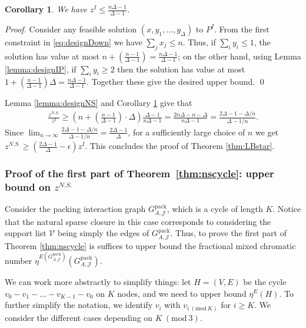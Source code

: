 \documentclass[smallextended]{svjour3}
\newtheorem{corollary}[proposition]{Corollary}
\begin{document}
	\begin{corollary}\label{cor:designOpt}
		We have $z^I \le \frac{n \Delta - 1}{\Delta -1}$.
	\end{corollary}
	
	\begin{proof}
		Consider any feasible solution $(x, y_1, \ldots, y_\Delta)$ to $P^I$. From the first constraint in \eqref{eq:designDown} we have $\sum_j x_j \le n$. Thus, if $\sum_i y_i \le 1$, the solution has value at most $n + \left(\frac{n-1}{\Delta -1}\right) = \frac{n \Delta - 1}{\Delta - 1}$; on the other hand, using Lemma \ref{lemma:designIP}, if $\sum_i y_i \ge 2$ then the solution has value at most $1 + \left(\frac{n-1}{\Delta -1}\right) \Delta = \frac{n \Delta - 1}{\Delta -1}$. Together these give the desired upper bound.{
\ifmp
	\hfill \qed
\fi
}
	\end{proof}
	
	Lemma \ref{lemma:designNS} and Corollary \ref{cor:designOpt} give that
		\begin{align*}
		\frac{z^{N.S.}}{z^I} \geq
\left( n + \left(\frac{n-1}{\Delta -1}\right) \cdot \Delta\right) \frac{\Delta-1}{n \Delta - 1} = \frac{2n \Delta - n - \Delta}{n \Delta-1} = \frac{2 \Delta - 1 - \Delta/n}{\Delta - 1/n}.
	\end{align*}
	Since $\lim_{n \rightarrow \infty} \frac{2 \Delta - 1 - \Delta/n}{\Delta - 1/n} = \frac{2\Delta -1}{\Delta}$, for a sufficiently large choice of $n$ we get $z^{N.S.} \ge \left(\frac{2 \Delta - 1}{\Delta} - \epsilon\right) z^I$. This concludes the proof of Theorem \ref{thm:LBstar}.

{}

\subsubsection{Proof of the first part of Theorem~\ref{thm:nscycle}: upper bound on $z^{N.S.}$}

	Consider the packing interaction graph ${G^{\textrm{pack}}_{A, {\mathcal{J}}}}$, which is a cycle of length $K$. Notice that the natural sparse closure in this case corresponds to considering the support list ${\mathcal{V}}$ being simply the edges of ${G^{\textrm{pack}}_{A, {\mathcal{J}}}}$. Thus, to prove the first part of Theorem \ref{thm:nscycle} is suffices to upper bound the fractional mixed chromatic number $\eta^{E({G^{\textrm{pack}}_{A, {\mathcal{J}}}})}({G^{\textrm{pack}}_{A, {\mathcal{J}}}})$.
	
	We can work more abstractly to simplify things: let $H = (V,E)$ be the cycle $v_0 - v_1 - \ldots - v_{K-1} - v_0$ on $K$ nodes, and we need to upper bound $\eta^E(H)$. To further simplify the notation, we identify $v_i$ with $v_{i {\ (\text{mod}\ {K})}}$ for $i \ge K$. We consider the different cases depending on $K {\ (\text{mod}\ {3})}$.
\end{document}
